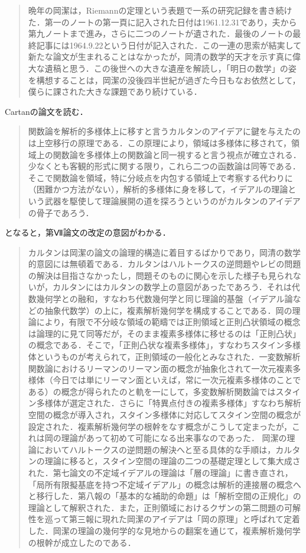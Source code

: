 \documentclass[uplatex, dvipdfmx]{jsreport}
\begin{document}
\begin{tcolorbox}[colframe=ForestGreen, colback=ForestGreen!10!white, breakable ,colbacktitle=ForestGreen!40!white, coltitle=black,fonttitle=\bfseries\sffamily,
    title=岡の第七論文]
\begin{quote}
    晩年の岡潔は，Riemannの定理という表題で一系の研究記録を書き続けた．第一のノートの第一頁に記入された日付は1961.12.31であり，夫から第九ノートまで進み，さらに二つのノートが遺された．最後のノートの最終記事には1964.9.22という日付が記入された．この一連の思索が結実して新たな論文が生まれることはなかったが，岡清の数学的天才を示す真に偉大な遺稿と思う．この後世への大きな遺産を解読し，「明日の数学」の姿を構想することは，岡潔の没後四半世紀が過ぎた今日もなお依然として，僕らに課された大きな課題であり続けている．
    \end{quote}
    Cartanの論文を読む．
    \begin{quote}
        関数論を解析的多様体上に移すと言うカルタンのアイデアに鍵を与えたのは上空移行の原理である．この原理により，領域は多様体に移されて，領域上の関数論を多様体上の関数論と同一視すると言う視点が確立される．少なくとも客観的形式に関する限り，これら二つの函数論は同等である．そこで関数論を領域，特に分岐点を内包する領域上で考察する代わりに（困難かつ方法がない），解析的多様体に身を移して，イデアルの理論という武器を駆使して理論展開の道を探ろうというのがカルタンのアイデアの骨子であろう．
    \end{quote}
    となると，第Ⅶ論文の改定の意図がわかる．
    \begin{quote}
        カルタンは岡潔の論文の論理的構造に着目するばかりであり，岡清の数学的意図には無頓着である．カルタンはハルトークスの逆問題やレビの問題の解決は目指さなかったし，問題そのものに関心を示した様子も見られないが，カルタンにはカルタンの数学上の意図があったであろう．それは代数幾何学との融和，すなわち代数幾何学と同じ理論的基盤（イデアル論などの抽象代数学）の上に，複素解析幾何学を構成することである．岡の理論により，有限で不分岐な領域の範疇では正則領域と正則凸状領域の概念は論理的に見て同等だが，そのまま複素多様体に移せるのは「正則凸状」の概念である．そこで，「正則凸状な複素多様体」，すなわちスタイン多様体というものが考えられて，正則領域の一般化とみなされた．一変数解析関数論におけるリーマンのリーマン面の概念が抽象化されて一次元複素多様体（今日では単にリーマン面といえば，常に一次元複素多様体のことである）の概念が得られたのと軌を一にして，多変数解析関数論ではスタイン多様体が選定された．さらに「特異点付きの複素多様体」すなわち解析空間の概念が導入され，スタイン多様体に対応してスタイン空間の概念が設定された．複素解析幾何学の根幹をなす概念がこうして定まったが，これは岡の理論があって初めて可能になる出来事なのであった．
        岡潔の理論においてハルトークスの逆問題の解決へと至る具体的な手順は，カルタンの理論に移ると，スタイン空間の理論の二つの基礎定理として集大成された．第七論文の不定域イデアルの理論は「層の理論」に書き直され，「局所有限擬基底を持つ不定域イデアル」の概念は解析的連接層の概念へと移行した．第八報の「基本的な補助的命題」は「解析空間の正規化」の理論として解釈された．また，正則領域におけるクザンの第二問題の可解性を巡って第三報に現れた岡潔のアイデアは「岡の原理」と呼ばれて定着した．岡潔の理論の幾何学的な見地からの翻案を通じて，複素解析幾何学の根幹が成立したのである．
    \end{quote}
\end{tcolorbox}
\end{document}
